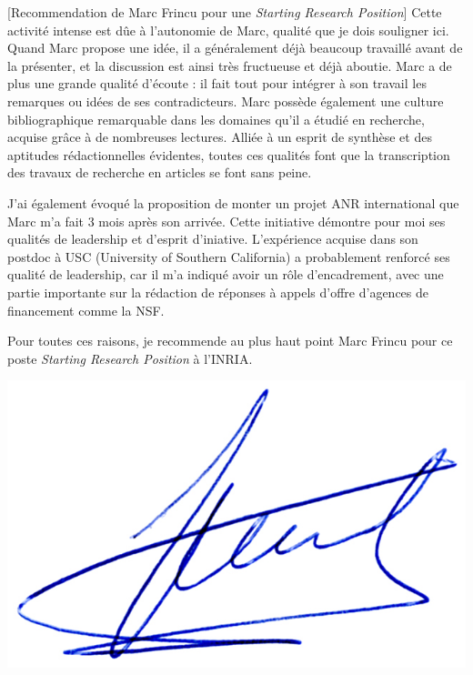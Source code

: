 \documentclass[a4paper,10pt]{article}
\begin{document}
\begin{letter}[Recommendation de Marc Frincu pour une \emph{Starting Research Position}]
Cette  activité intense  est dûe  à  l'autonomie de  Marc, qualité  que je  dois
souligner ici.   Quand Marc propose  une idée,  il a généralement  déjà beaucoup
travaillé avant de  la présenter, et la discussion est  ainsi très fructueuse et
déjà aboutie.  Marc a de plus  une grande qualité  d'écoute : il fait  tout pour
intégrer  à son  travail les  remarques ou  idées de  ses contradicteurs.   Marc
possède  également une  culture  bibliographique remarquable  dans les  domaines
qu'il a étudié  en recherche, acquise grâce à de  nombreuses lectures.  Alliée à
un esprit  de synthèse  et des aptitudes  rédactionnelles évidentes,  toutes ces
qualités font que la transcription des  travaux de recherche en articles se font
sans peine.

J'ai également évoqué  la proposition de monter un projet  ANR international que
Marc m'a fait 3  mois après son arrivée. Cette initiative  démontre pour moi ses
qualités de  leadership et d'esprit  d'iniative.  L'expérience acquise  dans son
postdoc à  USC (University of  Southern California) a probablement  renforcé ses
qualité de leadership, car il m'a  indiqué avoir un rôle d'encadrement, avec une
partie importante  sur la rédaction  de réponses  à appels d'offre  d'agences de
financement comme la NSF.

Pour toutes ces  raisons, je recommende au  plus haut point Marc  Frincu pour ce
poste \emph{Starting Research Position} à l'INRIA.


\end{letter}
\begin{flushright}
\includegraphics[width=.30\textwidth]{signgenaud.jpg}
\end{flushright}
%
%
\end{document}
